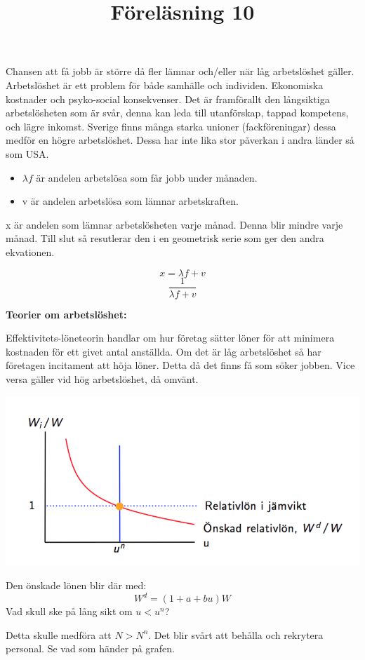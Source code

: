 \documentclass{article}
\begin{document}
Chansen att få jobb är större då fler lämnar och/eller när låg arbetslöshet gäller. Arbetslöshet är ett problem för både samhälle och individen. Ekonomiska kostnader och psyko-social konsekvenser. Det är framförallt den långsiktiga arbetslösheten som är svår, denna kan leda till utanförskap, tappad kompetens, och lägre inkomst. Sverige finns många starka unioner (fackföreningar) dessa medför en högre arbetslöshet. Dessa har inte lika stor påverkan i andra länder så som USA. 

\begin{itemize}
    \item $\lambda f $ är andelen arbetslösa som får jobb under månaden.
    \item v är andelen arbetslösa som lämnar arbetskraften. 
\end{itemize}

x är andelen som lämnar arbetslösheten varje månad. Denna blir mindre varje månad. Till slut så resutlerar den i en geometrisk serie som ger den andra ekvationen.  

$$
 x = \lambda f + v 
$$
$$
\frac{1}{\lambda f + v}
$$

\vspace{5mm}
\title{Föreläsning 10}
\vspace{5mm} \par \noindent 

\textbf{Teorier om arbetslöshet:}
\vspace{5mm} \par \noindent Effektivitets-löneteorin handlar om hur företag sätter löner för att minimera kostnaden för ett givet antal anställda. Om det är låg arbetslöshet så har företagen incitament att höja löner. Detta då det finns få som söker jobben. Vice versa gäller vid hög arbetslöshet, då omvänt. 

\includegraphics[scale=0.5]{skarm4}

Den önskade lönen blir där med: 
$$
W^d = (1+a+bu)W
$$
Vad skull ske på lång sikt om $ u < u^n$? \par \noindent 
Detta skulle medföra att $ N > N^n $. Det blir svårt att behålla och rekrytera personal. Se vad som händer på grafen. 
\end{document}
